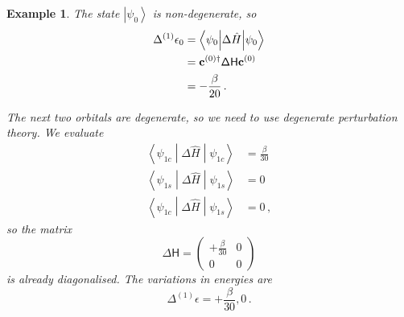 \documentclass{article}
\theoremstyle{plain}\theoremheaderfont{\normalfont\itshape}\theorembodyfont{\rmfamily}\theoremseparator{.}\newtheorem*{rem}{Remark}\newtheorem*{ex}{Example}\newtheorem*{proof}{Proof}\newtheorem*{altp}{Alternative proof}
\theoremstyle{plain}\theoremheaderfont{\normalfont\bfseries}\theorembodyfont{\rmfamily}\theoremseparator{.}\newtheorem{thm}{Theorem}[section]\newtheorem{lem}[thm]{Lemma}\newtheorem{prop}[thm]{Proposition}\newtheorem*{cor}{Corollary}\newtheorem{defn}[thm]{Definition}\newtheorem{clm}[thm]{Claim}\newtheorem{clminproof}{Claim}\newtheorem{pos}{Postulate}[section]
\theoremstyle{break}\theoremheaderfont{\normalfont\itshape}\theorembodyfont{\rmfamily}\theoremseparator{.\medskip}\newtheorem*{proofskip}{Proof}\newtheorem*{exs}{Examples}\newtheorem*{rems}{Remarks}
\theoremstyle{break}\theoremheaderfont{\normalfont\bfseries}\theorembodyfont{\rmfamily}\theoremseparator{.\medskip}\newtheorem{lemskip}[thm]{Lemma}\newtheorem{defnskip}[thm]{Definition}\newtheorem{propskip}[thm]{Proposition}\newtheorem{thmskip}[thm]{Theorem}
\numberwithin{equation}{section}
\newcommand{\ket}[1]{\left| #1 \right\rangle}
\newcommand{\expval}[2]{\left\langle #2 \middle| #1 \middle| #2 \right\rangle}
\newcommand{\mel}[3]{\left\langle #1 \middle| #2 \middle| #3 \right\rangle}
\newcommand{\vb}[1]{\bm{\mathrm{#1}}}
\begin{document}
\begin{ex}
        The state \(\ket{\psi_0}\) is non-degenerate, so
        \begin{align}
            \Delta^{(1)}\epsilon_0&=\expval{\Delta\hat{H}}{\psi_0}\notag\\
            &=\vb{c}^{(0)\dagger}\mathsf{\Delta H}\vb{c}^{(0)}\notag\\
            &=-\frac{\beta}{20}\,.
        \end{align}

        The next two orbitals are degenerate, so we need to use degenerate perturbation theory. We evaluate
        \begin{align}
            \expval{\Delta\hat{H}}{\psi_{1c}}&=\frac{\beta}{30}\\
            \expval{\Delta\hat{H}}{\psi_{1s}}&=0\\
            \mel{\psi_{1c}}{\Delta\hat{H}}{\psi_{1s}}&=0\,,
        \end{align}
        so the matrix
        \begin{equation}
            \mathsf{\Delta H}=\begin{pmatrix}
                +\frac{\beta}{30} & 0 \\
                0 & 0
            \end{pmatrix}
        \end{equation}
        is already diagonalised. The variations in energies are
        \begin{equation}
            \Delta^{(1)}\epsilon=+\frac{\beta}{30},0\,.
        \end{equation}


\end{ex}
\end{document}
